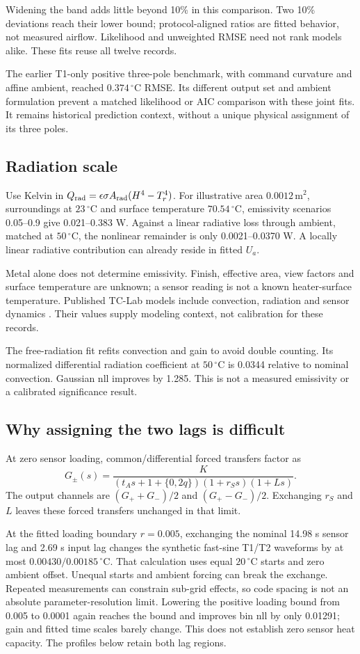 \documentclass[10pt,letterpaper]{article}
\newcommand{\C}{\,^\circ\mathrm{C}}
\begin{document}
Widening the band adds little beyond 10\% in this comparison. Two 10\%
deviations reach their lower bound; protocol-aligned ratios are fitted
behavior, not measured airflow. Likelihood and unweighted RMSE need
not rank models alike. These fits reuse all twelve records.

The earlier T1-only positive three-pole benchmark, with command curvature and
affine ambient, reached $0.374\C$ RMSE. Its different output set and ambient
formulation prevent a matched likelihood or AIC comparison with these joint
fits. It remains historical prediction context, without a unique physical
assignment of its three poles.

\subsection*{Radiation scale}
Use Kelvin in $Q_{\rm rad}=\epsilon\sigma A_{\rm rad}(H^4-T_r^4)$.
For illustrative area $0.0012\,\mathrm{m^2}$, surroundings at $23\C$ and
surface temperature $70.54\C$, emissivity scenarios 0.05--0.9 give
0.021--0.383 W. Against a linear radiative loss through ambient, matched
at $50\C$, the nonlinear remainder is only 0.0021--0.0370 W.
A locally linear radiative contribution can already reside in fitted $U_a$.

Metal alone does not determine emissivity. Finish, effective area,
view factors and surface temperature are unknown; a sensor reading is not a
known heater-surface temperature. Published TC-Lab models include convection,
radiation and sensor dynamics \cite{park2020}. Their values supply modeling
context, not calibration for these records.

The free-radiation fit refits convection and gain to avoid double counting.
Its normalized differential radiation coefficient at $50\C$ is 0.0344
relative to nominal convection. Gaussian nll improves by 1.285. This is not a
measured emissivity or a calibrated significance result.

\subsection*{Why assigning the two lags is difficult}
At zero sensor loading, common/differential forced transfers factor as
\[
 G_\pm(s)=
 \frac{K}{(t_A s+1+\{0,2q\})(1+r_Ss)(1+Ls)}.
\]
The output channels are $(G_++G_-)/2$ and $(G_+-G_-)/2$. Exchanging
$r_S$ and $L$ leaves these forced transfers unchanged in that limit.

At the fitted loading boundary $r=0.005$, exchanging the nominal 14.98 s
sensor lag and 2.69 s input lag changes the synthetic fast-sine T1/T2
waveforms by at most $0.00430/0.00185\C$. That calculation uses equal
$20\C$ starts and zero ambient offset. Unequal starts and ambient forcing
can break the exchange. Repeated measurements can constrain sub-grid
effects, so code spacing is not an absolute parameter-resolution limit.
Lowering the positive loading bound from 0.005 to 0.0001 again reaches the
bound and improves bin nll by only 0.01291; gain and fitted time scales barely
change. This does not establish zero sensor heat capacity. The profiles below retain both lag regions.
\end{document}
